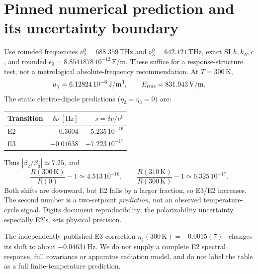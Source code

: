 \documentclass[11pt,a4paper]{article}
\begin{document}
\section{Pinned numerical prediction and its uncertainty boundary}
Use rounded frequencies $\nu_2^0=688.359\,\mathrm{THz}$ and
$\nu_3^0=642.121\,\mathrm{THz}$, exact SI $h,k_B,c$, and rounded
$\epsilon_0=8.8541878\,10^{-12}\,\mathrm{F/m}$.
These suffice for a response-structure test, not a metrological
absolute-frequency recommendation. At $T=300\,\mathrm K$,
\begin{equation}
 u_\gamma=6.12824\,10^{-6}\,\mathrm{J/m^3},\qquad
 E_{\rm rms}=831.943\,\mathrm{V/m}.
\end{equation}
The static electric-dipole predictions ($\eta_2=\eta_3=0$) are:
\begin{center}
\begin{tabular}{@{}lrr@{}}
\toprule
Transition & $\delta\nu\ [\mathrm{Hz}]$ & $s=\delta\nu/\nu^0$\\
\midrule
E2 & $-0.3604$ & $-5.235\,10^{-16}$\\
E3 & $-0.04638$ & $-7.223\,10^{-17}$\\
\bottomrule
\end{tabular}
\end{center}
Thus $|\beta_2/\beta_3|\simeq7.25$, and
\begin{equation}
 \frac{R(300\,\mathrm K)}{R(0)}-1\simeq4.513\,10^{-16},\qquad
 \frac{R(310\,\mathrm K)}{R(300\,\mathrm K)}-1\simeq6.325\,10^{-17}.
\end{equation}
Both shifts are downward, but E2 falls by a larger fraction, so E3/E2
increases. The second number is a two-setpoint \emph{prediction}, not
an observed temperature-cycle signal. Digits document reproducibility;
the polarizability uncertainty, especially E2's, sets physical precision.

The independently published E3 correction
$\eta_3(300\,\mathrm K)=-0.0015(7)$~\cite{huntemann} changes its
shift to about $-0.04631\,\mathrm{Hz}$. We do not supply a complete
E2 spectral response, full covariance or apparatus radiation model,
and do not label the table as a full finite-temperature prediction.
\end{document}
